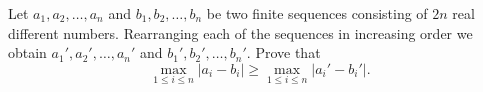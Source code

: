 Let $a_1,a_2,\ldots,a_n$ and $b_1,b_2,\ldots,b_n$ be two finite sequences consisting of $2n$ real different numbers. Rearranging each of the sequences in increasing order we obtain $a_1',a_2',\ldots,a_n'$ and $b_1',b_2',\ldots,b_n'$. Prove that\[\max_{1\le i\le n}|a_i-b_i|\ge\max_{1\le i\le n}|a_i'-b_i'|.\]